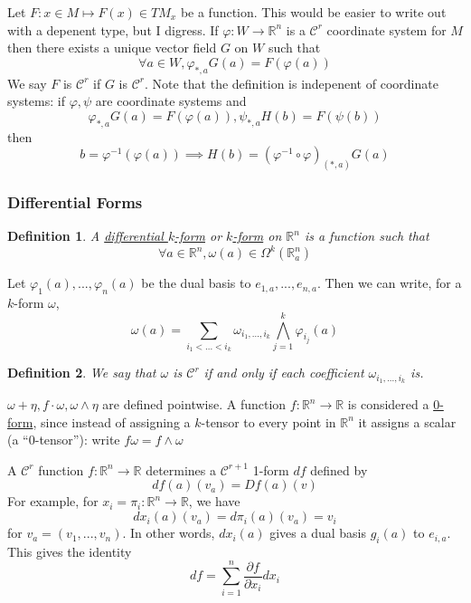 \documentclass{article}
\newtheorem{definition}{Definition}
\newcommand{\reals}[0]{\mathbb{R}}
\newcommand{\mc}[1]{\mathcal{#1}}
\newcommand{\prt}[2]{\frac{\partial #1}{\partial #2}}
\begin{document}
Let \(F: x \in M \mapsto F(x) \in TM_x\) be a function. This would be easier to write out with a depenent type, but I digress. If \(\varphi: W \to \reals^n\) is a \(\mc{C}^r\) coordinate system for \(M\) then there exists a unique vector field \(G\) on \(W\) such that
\begin{equation}
  \forall a \in W, \varphi_{*,a}G(a) = F(\varphi(a))
\end{equation}
We say \(F\) is \(\mc{C}^r\) if \(G\) is \(\mc{C}^r\). Note that the definition is indepenent of coordinate systems: if \(\varphi, \psi\) are coordinate systems and
\begin{equation}
  \varphi_{*, a}G(a) = F(\varphi(a)), \psi_{*, a}H(b) = F(\psi(b))
\end{equation}
then
\begin{equation}
  b = \varphi^{-1}(\varphi(a)) \implies H(b) = (\varphi^{-1} \circ \varphi)_{(*, a)}G(a)
\end{equation}

\subsubsection{Differential Forms}

\begin{definition}
  A \underline{differential \(k\)-form} or \underline{\(k\)-form} on \(\reals^n\) is a function such that
  \begin{equation}
    \forall a \in \reals^n, \omega(a) \in \Omega^k(\reals_a^n)
  \end{equation}
\end{definition}
Let \(\varphi_1(a),...,\varphi_n(a)\) be the dual basis to \(e_{1,a},...,e_{n,a}\). Then we can write, for a \(k\)-form \(\omega\),
\begin{equation}
  \omega(a) = \sum_{i_1 < ... < i_k}\omega_{i_1,...,i_k}\bigwedge_{j = 1}^k\varphi_{i_j}(a)
\end{equation}
\begin{definition}
  We say that \(\omega\) is \underline{\(\mc{C}^r\)} if and only if each coefficient \(\omega_{i_1,...,i_k}\) is.
\end{definition}
\(\omega + \eta, f \cdot \omega, \omega \wedge \eta\) are defined pointwise.
A function \(f: \reals^n \to \reals\) is considered a \underline{0-form}, since instead of assigning a \(k\)-tensor to every point in \(\reals^n\) it assigns a scalar (a ``\(0\)-tensor''): write \(f\omega = f \wedge \omega\)

A \(\mc{C}^r\) function \(f: \reals^n \to \reals\) determines a \(\mc{C}^{r + 1}\) 1-form \(df\) defined by
\begin{equation}
  df(a)(v_a) = Df(a)(v)
\end{equation}
For example, for \(x_i = \pi_i : \reals^n \to \reals\), we have
\begin{equation}
  dx_i(a)(v_a) = d\pi_i(a)(v_a) = v_i
\end{equation}
for \(v_a = (v_1,...,v_n)\). In other words, \(dx_i(a)\) gives a dual basis \(g_i(a)\) to \(e_{i, a}\). This gives the identity
\begin{equation}
  df = \sum_{i = 1}^n\prt{f}{x_i}dx_i
\end{equation}
\end{document}
